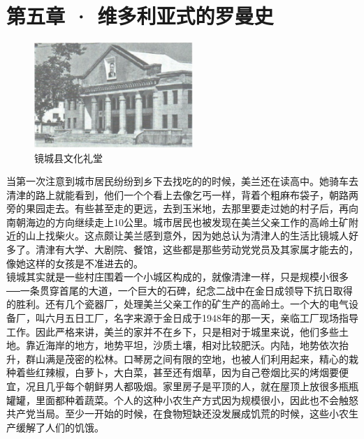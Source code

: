 \fancyhead[RO]{\thepage}
\fancyhead[LE]{\thepage}
\fancyfoot[LE,RO]{}
\fancyfoot[LO,CE]{}
\fancyfoot[CO,RE]{}
\chapter*{第五章 · 维多利亚式的罗曼史}
\begin{figure}[!htbp]
	\centering
	\includegraphics[width=6cm]{./Chapters/Images/05.jpg}
	\caption*{镜城县文化礼堂}
\end{figure}


当第一次注意到城市居民纷纷到乡下去找吃的的时候，美兰还在读高中。她骑车去清津的路上就能看到，他们一个个看上去像乞丐一样，背着个粗麻布袋子，朝路两旁的果园走去。有些甚至走的更远，去到玉米地，去那里要走过她的村子后，再向南朝海边的方向继续走上10公里。城市居民也被发现在美兰父亲工作的高岭土矿附近的山上找柴火。这点颇让美兰感到意外，因为她总认为清津人的生活比镜城人好多了。清津有大学、大剧院、餐馆，这些都是那些劳动党党员及其家属才能去的，像她这样的女孩是不准进去的。\\

镜城其实就是一些村庄围着一个小城区构成的，就像清津一样，只是规模小很多──一条贯穿首尾的大道，一个巨大的石碑，纪念二战中在金日成领导下抗日取得的胜利。还有几个瓷器厂，处理美兰父亲工作的矿生产的高岭土。一个大的电气设备厂，叫六月五日工厂，名字来源于金日成于1948年的那一天，亲临工厂现场指导工作。因此严格来讲，美兰的家并不在乡下，只是相对于城里来说，他们多些土地。靠近海岸的地方，地势平坦，沙质土壤，相对比较肥沃。内陆，地势依次抬升，群山满是茂密的松林。口琴房之间有限的空地，也被人们利用起来，精心的栽种着些红辣椒，白萝卜，大白菜，甚至还有烟草，因为自己卷烟比买的烤烟要便宜，况且几乎每个朝鲜男人都吸烟。家里房子是平顶的人，就在屋顶上放很多瓶瓶罐罐，里面都种着蔬菜。个人的这种小农生产方式因为规模很小，因此也不会触怒共产党当局。至少一开始的时候，在食物短缺还没发展成饥荒的时候，这些小农生产缓解了人们的饥饿。\\

